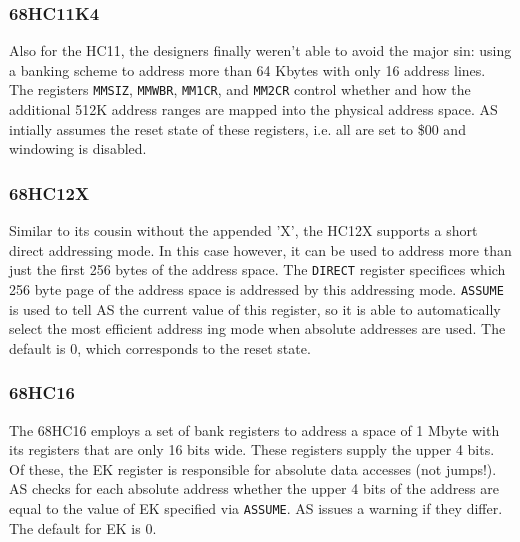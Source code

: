 \documentclass[12pt,twoside]{report}
\newcommand{\tty}[1]{{\tt #1}}
\begin{document}

\subsubsection{68HC11K4}

Also for the HC11, the designers finally weren't able to avoid the major
sin: using a banking scheme to address more than 64 Kbytes with only 16
address lines.  The registers {\tt MMSIZ}, {\tt MMWBR}, {\tt MM1CR}, and
{\tt MM2CR} control whether and how the additional 512K address ranges are
mapped into the physical address space.  AS intially assumes the reset
state of these registers, i.e. all are set to \$00 and windowing is
disabled.


\subsubsection{68HC12X}

Similar to its cousin without the appended 'X', the HC12X supports a short
direct addressing mode.  In this case however, it can be used to address
more than just the first 256 bytes of the address space.  The {\tt DIRECT}
register specifices which 256 byte page of the address space is addressed
by this addressing mode.  {\tt ASSUME} is used to tell AS the current
value of this register, so it is able to automatically select the most
efficient address ing mode when absolute addresses are used.  The default
is 0, which corresponds to the reset state.


\subsubsection{68HC16}

The 68HC16 employs a set of bank registers to address a space of 1
Mbyte with its registers that are only 16 bits wide.  These registers
supply the upper 4 bits.  Of these, the EK register is responsible
for absolute data accesses (not jumps!).  AS checks for each absolute
address whether the upper 4 bits of the address are equal to the
value of EK specified via \tty{ASSUME}.  AS issues a warning if they
differ.  The default for EK is 0.

\end{document}
